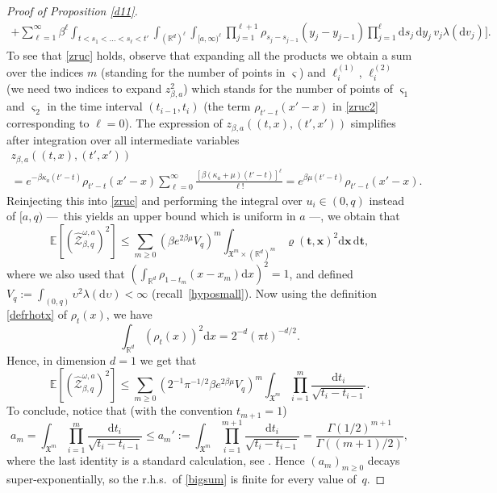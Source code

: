 \documentclass[JEP,XML,SOM,Unicode,published]{cedram}
\let\mathcal\mathscr
\theoremstyle{definition}
\newcommand{\bt}{\boldsymbol{t}}
\newcommand{\bx}{\boldsymbol{x}}
\newcommand{\dd}{\mathrm{d}}
\newcommand{\cZ}{{\ensuremath{\mathcal Z}} }
\newcommand{\bbE}{{\ensuremath{\mathbb E}} }
\newcommand{\bbR}{{\ensuremath{\mathbb R}} }
\let\gb\beta
\let\gG\Gamma
\let\ups\upsilon
\let\go\omega
\begin{document}
\begin{proof}[Proof of Proposition \ref{d11}]
\begin{multline}
+ \sum_{\ell=1}^{\infty} \beta^{\ell} \int_{ t< s_1<\dots<s_{\ell}<t' } \int_{(\bbR^d)^{\ell}} \int_{[a,\infty)^\ell} \prod_{j=1}^{\ell+1} \rho_{s_j-s_{j-1}} (y_j-y_{j-1}) \prod_{j=1}^{\ell}
\dd s_j\, \dd y_j\, v_j \lambda(\dd v_j) \bigg].
\end{multline}
To see that \eqref{zruc} holds, observe that expanding all the products we obtain a sum over the indices $m$ (standing for the number of points in $\varsigma$) and $\ell^{(1)}_i$, $\ell^{(2)}_i$ (we need two indices to expand $z^2_{\beta,a}$) which stands for
the number of points of $\varsigma_1$ and $\varsigma_2$ in the time interval $(t_{i-1},t_{i})$
(the term $\rho_{t'-t}(x'-x)$ in \eqref{zruc2} corresponding to $\ell=0$).
The expression of $z_{\beta,a} ((t,x), (t',x'))$ simplifies after integration over all intermediate variables\vspace*{-5pt}
\begin{multline}
z_{\beta,a} ((t,x), (t',x')) \\[-5pt]
= e^{ -\gb \kappa_a (t'-t)} \rho_{t'-t}(x'-x) \sum_{\ell=0}^{\infty} \frac{[\gb (\kappa_a +\mu) (t'-t)]^{\ell}}{ \ell !}= e^{ \gb \mu (t'-t)}
\rho_{t'-t}(x'-x).
\end{multline}
Reinjecting this into \eqref{zruc} and performing the integral over $u_i\in (0,q)$ instead of $[a,q)$ ---~this yields an upper bound which is uniform in $a$ ---, we obtain that
\begin{equation}
\label{eq:secondmomentZq}
\bbE \left[ (\hat \cZ^{\go,a}_{\beta,q})^2 \right]
\le \sum_{m \ge 0} \left(\gb e^{2\gb \mu} V_q \right)^{m} \int_{ \mathfrak{X}^m \times (\bbR^d)^m}
\varrho(\bt,\bx)^2
\dd \bx\, \dd \bt,
\end{equation}
where we also used that $(\int_{\bbR^d} \!\rho_{1-t_m}(x-x_m) \dd x)^2\!=\!1$, and defined \hbox{$V_q \!:=\! \int_{(0,q)}\! \ups^2 \lambda(\dd \ups)\!<\!\infty$} (recall~\eqref{hyposmall}).
Now using the definition \eqref{defrhotx} of $\rho_t(x)$, we have
\begin{equation}\label{lekalek}
\int_{\bbR^d}(\rho_{t}(x))^2\dd x
= 2^{-d}(\pi t)^{-d/2}.
\end{equation}
Hence, in dimension $d=1$ we get that
\begin{equation}\label{bigsum}
\bbE \left[ (\hat \cZ^{\go,a}_{\beta,q})^2 \right]\le \sum_{m \ge 0} \left(2^{-1}\pi^{-1/2} \beta e^{2\gb \mu} V_q \right)^{m} \int_{\mathfrak{X}^m} \prod_{i=1}^m
\frac{ \dd t_i}{\sqrt {t_i-t_{i-1}}}.
\end{equation}
To conclude, notice that (with the convention $t_{m+1}=1$)
\[
a_m= \int_{\mathfrak{X}^m} \prod_{i=1}^m
\frac{ \dd t_i}{\sqrt {t_i-t_{i-1}}}
\leq a_m' := \int_{\mathfrak{X}^m}
\prod_{i=1}^{m+1}
\frac{ \dd t_i}{\sqrt {t_i-t_{i-1}}}
= \frac{\gG(1/2)^{m+1} }{\gG((m+1)/2)},
\]
where the last identity is a standard calculation, see \eg \cite[Lem.\,A.3]{BL20_disc}.
Hence $(a_m)_{m\geq 0}$ decays super-exponentially,
so the r.h.s.\ of \eqref{bigsum} is finite for every value of~$q$.
\end{proof}
\end{document}
